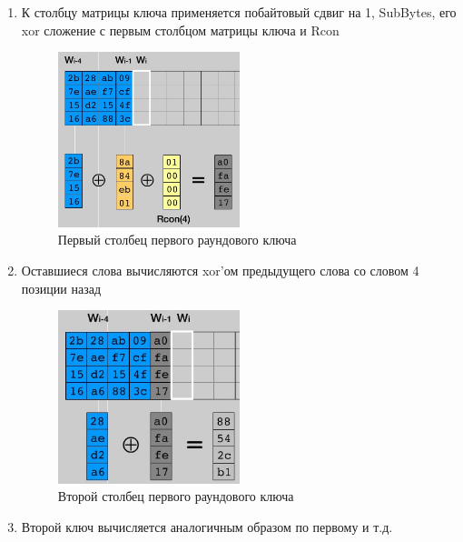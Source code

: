 \documentclass[a4paper, 14pt]{extarticle}
\begin{document}
\begin{enumerate}
    \item К столбцу матрицы ключа применяется побайтовый сдвиг на 1, SubBytes, его xor сложение с первым столбцом матрицы ключа и Rcon
    \begin{figure}[h]
        \centering
        \includegraphics[width=0.5\textwidth]{img/S011.jpg}
        \caption{Первый столбец первого раундового ключа}
    \end{figure}
    \item Оставшиеся слова вычисляются xor'ом предыдущего слова со словом 4 позиции назад
    \begin{figure}[h]
        \centering
        \includegraphics[width=0.5\textwidth]{img/S012.jpg}
        \caption{Второй столбец первого раундового ключа}
    \end{figure}
    \FloatBarrier{}
    \item Второй ключ вычисляется аналогичным образом по первому и т.д.
\end{enumerate}
\end{document}
